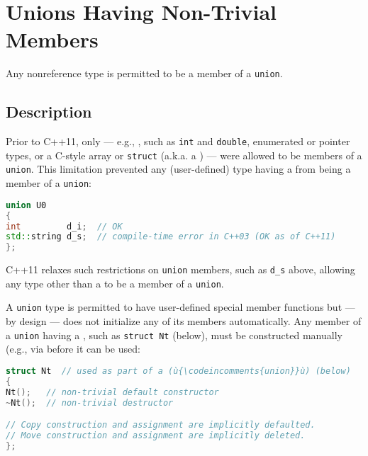 \newpage
\section[{\tt union} '11]{Unions Having Non-Trivial Members}\label{unrestricted-unions}


Any nonreference type is permitted to be a member of a \lstinline!union!.

\subsection[Description]{Description}\label{unrestrictedunion-description}

Prior to C++11, only  --- e.g.,
, such as \lstinline!int! and \lstinline!double!,
enumerated or pointer types, or a C-style array or \lstinline!struct!
(a.k.a. a ) --- were allowed to be members of a
\lstinline!union!. This limitation prevented any (user-defined) type having
a  from being a member of a
\lstinline!union!:

\begin{lstlisting}[language=C++]
union U0
{
int         d_i;  // OK
std::string d_s;  // compile-time error in C++03 (OK as of C++11)
};
\end{lstlisting}

\noindent C++11 relaxes such restrictions on \lstinline!union! members, such as
\lstinline!d_s! above, allowing any type other than a  to be a member of a \lstinline!union!.

A \lstinline!union! type is permitted to have user-defined special member
functions but --- by design --- does not initialize any of its members
automatically. Any member of a \lstinline!union! having a
, such as \lstinline!struct!~\lstinline!Nt!
(below), must be constructed manually (e.g., via  before it can be used:

\begin{lstlisting}[language=C++]
struct Nt  // used as part of a (ù{\codeincomments{union}}ù) (below)
{
Nt();   // non-trivial default constructor
~Nt();  // non-trivial destructor

// Copy construction and assignment are implicitly defaulted.
// Move construction and assignment are implicitly deleted.
};
\end{lstlisting}

